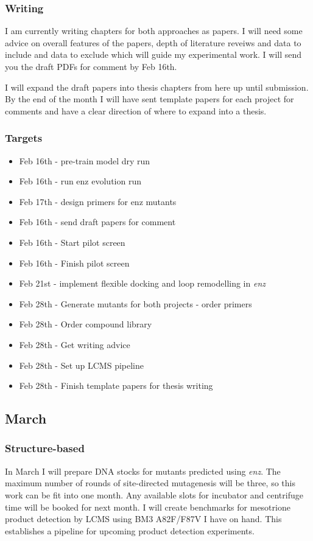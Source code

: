 \documentclass{article}
\begin{document}
\subsubsection{Writing}
I am currently writing chapters for both approaches as papers. I will need some advice on overall features of the papers, depth of literature reveiws and data to include and data to exclude which will guide my experimental work. %
I will send you the draft PDFs for comment by Feb 16th. %
\par
I will expand the draft papers into thesis chapters from here up until submission. %
By the end of the month I will have sent template papers for each project for comments and have a clear direction of where to expand into a thesis. %
\subsubsection{Targets}
\begin{itemize}
\item Feb 16th - pre-train model dry run
\item Feb 16th - run enz evolution run
\item Feb 17th - design primers for enz mutants
\item Feb 16th - send draft papers for comment
\item Feb 16th - Start pilot screen
\item Feb 16th - Finish pilot screen
\item Feb 21st - implement flexible docking and loop remodelling in \textit{enz}
\item Feb 28th - Generate mutants for both projects - order primers
\item Feb 28th - Order compound library
\item Feb 28th - Get writing advice
\item Feb 28th - Set up LCMS pipeline
\item Feb 28th - Finish template papers for thesis writing
\end{itemize}

\subsection{March}
\subsubsection{Structure-based}
In March I will prepare DNA stocks for mutants predicted using \textit{enz}. The maximum number of rounds of site-directed mutagenesis will be three, so this work can be fit into one month.  %
Any available slots for incubator and centrifuge time will be booked for next month. %
I will create benchmarks for mesotrione product detection by LCMS using BM3 A82F/F87V I have on hand. This establishes a pipeline for upcoming product detection experiments. %
\end{document}
